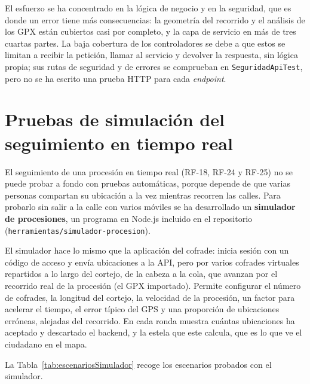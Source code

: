 El esfuerzo se ha concentrado en la lógica de negocio y en la seguridad, que es donde un error tiene más consecuencias: la geometría del recorrido y el análisis de los GPX están cubiertos casi por completo, y la capa de servicio en más de tres cuartas partes. La baja cobertura de los controladores se debe a que estos se limitan a recibir la petición, llamar al servicio y devolver la respuesta, sin lógica propia; sus rutas de seguridad y de errores se comprueban en \texttt{SeguridadApiTest}, pero no se ha escrito una prueba HTTP para cada \emph{endpoint}.

\section{Pruebas de simulación del seguimiento en tiempo real}\label{sec:simulador}

El seguimiento de una procesión en tiempo real (RF-18, RF-24 y RF-25) no se puede probar a fondo con pruebas automáticas, porque depende de que varias personas compartan su ubicación a la vez mientras recorren las calles. Para probarlo sin salir a la calle con varios móviles se ha desarrollado un \textbf{simulador de procesiones}, un programa en Node.js incluido en el repositorio (\texttt{herramientas/simulador-procesion}).

El simulador hace lo mismo que la aplicación del cofrade: inicia sesión con un código de acceso y envía ubicaciones a la API, pero por varios cofrades virtuales repartidos a lo largo del cortejo, de la cabeza a la cola, que avanzan por el recorrido real de la procesión (el GPX importado). Permite configurar el número de cofrades, la longitud del cortejo, la velocidad de la procesión, un factor para acelerar el tiempo, el error típico del GPS y una proporción de ubicaciones erróneas, alejadas del recorrido. En cada ronda muestra cuántas ubicaciones ha aceptado y descartado el backend, y la estela que este calcula, que es lo que ve el ciudadano en el mapa.

La Tabla~\ref{tab:escenariosSimulador} recoge los escenarios probados con el simulador.

